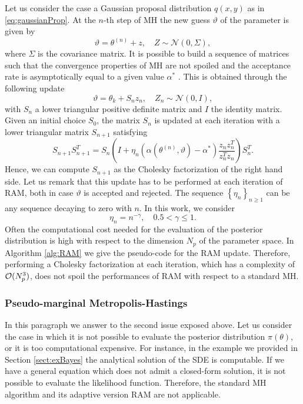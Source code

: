 Let us consider the case a Gaussian proposal distribution $q(x,y)$ as in \eqref{eq:gaussianProp}. At the $n$-th step of MH the new guess $\vartheta$ of the parameter is given by
\begin{equation}
\vartheta = \theta^{(n)} + z, \quad Z \sim \mathcal{N}(0, \Sigma),
\end{equation}
where $\Sigma$ is the covariance matrix. It is possible to build a sequence of matrices such that the convergence properties of MH are not spoiled and the acceptance rate is asymptotically equal to a given value $\alpha^*$ \cite{Vih12}. This is obtained through the following update 
\begin{equation}
\vartheta = \theta_k + S_n z_n, \quad Z_n \sim \mathcal{N}(0, I),
\end{equation}
with $S_n$ a lower triangular positive definite matrix and $I$ the identity matrix. Given an initial choice $S_0$, the matrix $S_n$ is updated at each iteration with a lower triangular matrix $S_{n+1}$ satisfying
\begin{equation}\label{eq:RAMupdate}
S_{n+1}S_{n+1}^T = S_n\left(I + \eta_n\left(\alpha(\theta^{(n)}, \vartheta) - \alpha^*\right)\frac{z_nz_n^T}{z_n^Tz_n}\right)S_n^T.
\end{equation}
Hence, we can compute $S_{n+1}$ as the Cholesky factorization of the right hand side. Let us remark that this update has to be performed at each iteration of RAM, both in case $\vartheta$ is accepted and rejected. The sequence $\left\{\eta_n\right\}_{n\geq 1}$ can be any sequence decaying to zero with $n$. In this work, we consider
\begin{equation}
\eta_n = n^{-\gamma}, \quad 0.5 < \gamma \leq 1.
\end{equation}
Often the computational cost needed for the evaluation of the posterior distribution is high with respect to the dimension $N_p$ of the parameter space. In Algorithm \ref{alg:RAM} we give the pseudo-code for the RAM update. Therefore, performing a Cholesky factorization at each iteration, which has a complexity of $\mathcal{O}(N_p^3)$, does not spoil the performances of RAM with respect to a standard MH. 

\subsubsection{Pseudo-marginal Metropolis-Hastings}

In this paragraph we answer to the second issue exposed above. Let us consider the case in which it is not possible to evaluate the posterior distribution $\pi(\theta)$, or it is too computational expensive. For instance, in the example we provided in Section \ref{sect:exBayes} the analytical solution of the SDE is computable. If we have a general equation which does not admit a closed-form solution, it is not possible to evaluate the likelihood function. Therefore, the standard MH algorithm and its adaptive version RAM are not applicable.

